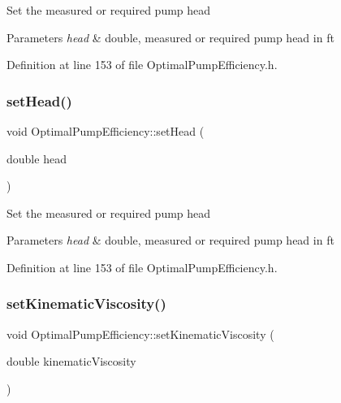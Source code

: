 Set the measured or required pump head 
\begin{DoxyParams}{Parameters}
{\em head} & double, measured or required pump head in ft \\
\hline
\end{DoxyParams}


Definition at line 153 of file Optimal\+Pump\+Efficiency.\+h.

\mbox{\label{class_optimal_pump_efficiency_ac317c900ec68797cf051977147ea33da}} 
\subsubsection{\texorpdfstring{set\+Head()}{setHead()}\hspace{0.1cm}{\footnotesize\ttfamily [3/3]}}
{\footnotesize\ttfamily void Optimal\+Pump\+Efficiency\+::set\+Head (\begin{DoxyParamCaption}\item[{double}]{head }\end{DoxyParamCaption})\hspace{0.3cm}{\ttfamily [inline]}}

Set the measured or required pump head 
\begin{DoxyParams}{Parameters}
{\em head} & double, measured or required pump head in ft \\
\hline
\end{DoxyParams}


Definition at line 153 of file Optimal\+Pump\+Efficiency.\+h.

\mbox{\label{class_optimal_pump_efficiency_a00017e0bd100beb2f4b0bf2db5e3687f}} 
\subsubsection{\texorpdfstring{set\+Kinematic\+Viscosity()}{setKinematicViscosity()}\hspace{0.1cm}{\footnotesize\ttfamily [1/3]}}
{\footnotesize\ttfamily void Optimal\+Pump\+Efficiency\+::set\+Kinematic\+Viscosity (\begin{DoxyParamCaption}\item[{double}]{kinematic\+Viscosity }\end{DoxyParamCaption})\hspace{0.3cm}{\ttfamily [inline]}}

